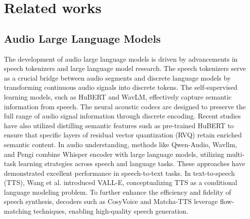 \section{Related works}
\subsection{Audio Large Language Models}
The development of audio large language models is driven by advancements in speech tokenizers and large language model research. The speech tokenizers serve as a crucial bridge between audio segments and discrete language models by transforming continuous audio signals into discrete tokens. The self-supervised learning models, such as HuBERT\cite{hsu2021hubert} and WavLM\cite{chen2022wavlm}, effectively capture semantic information from speech. The neural acoustic codecs \cite{zeghidour2021soundstream,defossez2022high,kumar2024high} are designed to preserve the full range of audio signal information through discrete encoding. Recent studies \cite{zhang2024speechtokenizer,defossez2024moshi} have also utilized distilling semantic features sush as pre-trained HuBERT to ensure that specific layers of residual vector quantization (RVQ) retain enriched semantic content. In audio understanding, methods like Qwen-Audio\cite{chu2023qwen,chu2024qwen2}, Wavllm\cite{hu2024wavllm}, and Pengi\cite{deshmukh2023pengi} combine Whisper encoder\cite{radford2023robust} with large language models, utilizing multi-task learning strategies across speech and language tasks. These approaches have demonstrated excellent performance in speech-to-text tasks. In text-to-speech (TTS), Wang et al. introduced VALL-E\cite{wang2023neural}, conceptualizing TTS as a conditional language modeling problem. To further enhance the efficiency and fidelity of speech synthesis, decoders such as CosyVoice\cite{du2024cosyvoice} and Matcha-TTS\cite{mehta2024matcha} leverage flow-matching techniques, enabling high-quality speech generation.


